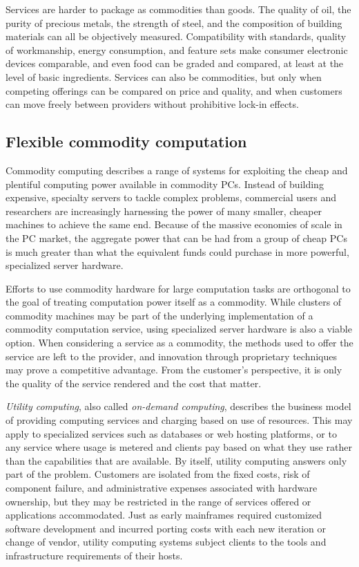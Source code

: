 Services are harder to package as commodities than goods. The quality of oil, the purity of precious metals, the strength of steel, and the composition of building materials can all be objectively measured. Compatibility with standards, quality of workmanship, energy consumption, and feature sets make consumer electronic devices comparable, and even food can be graded and compared, at least at the level of basic ingredients. Services can also be commodities, but only when competing offerings can be compared on price and quality, and when customers can move freely between providers without prohibitive lock-in effects.

\subsection{Flexible commodity computation}

Commodity computing describes a range of systems for exploiting the cheap and plentiful computing power available in commodity PCs. Instead of building expensive, specialty servers to tackle complex problems, commercial users and researchers are increasingly harnessing the power of many smaller, cheaper machines to achieve the same end. Because of the massive economies of scale in the PC market, the aggregate power that can be had from a group of cheap PCs is much greater than what the equivalent funds could purchase in more powerful, specialized server hardware.

Efforts to use commodity hardware for large computation tasks are orthogonal to the goal of treating computation power itself as a commodity. While clusters of commodity machines may be part of the underlying implementation of a commodity computation service, using specialized server hardware is also a viable option. When considering a service as a commodity, the methods used to offer the service are left to the provider, and innovation through proprietary techniques may prove a competitive advantage. From the customer's perspective, it is only the quality of the service rendered and the cost that matter.

\emph{Utility computing}, also called \emph{on-demand computing}, describes the business model of providing computing services and charging based on use of resources. This may apply to specialized services such as databases or web hosting platforms, or to any service where usage is metered and clients pay based on what they use rather than the capabilities that are available. By itself, utility computing answers only part of the problem. Customers are isolated from the fixed costs, risk of component failure, and administrative expenses associated with hardware ownership, but they may be restricted in the range of services offered or applications accommodated. Just as early mainframes required customized software development and incurred porting costs with each new iteration or change of vendor, utility computing systems subject clients to the tools and infrastructure requirements of their hosts.

